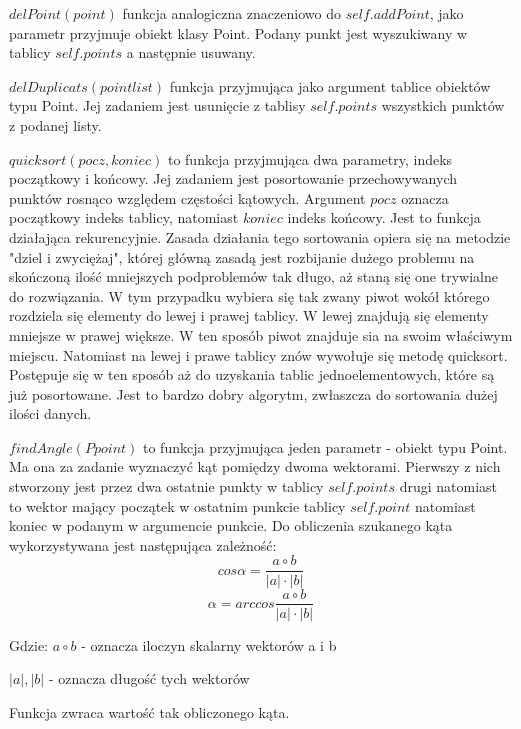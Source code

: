 $delPoint(point)$ funkcja analogiczna znaczeniowo do $self.addPoint$, jako parametr przyjmuje obiekt klasy Point. Podany punkt jest wyszukiwany w tablicy $self.points$ a następnie usuwany.

$delDuplicats(pointlist)$ funkcja przyjmująca jako argument tablice obiektów typu Point. Jej zadaniem jest usunięcie z tablisy $self.points$ wszystkich punktów z podanej listy.

$quicksort(pocz,koniec)$ to funkcja przyjmująca dwa parametry, indeks początkowy i końcowy. Jej zadaniem jest posortowanie przechowywanych punktów rosnąco względem częstości kątowych. Argument $pocz$ oznacza początkowy indeks tablicy, natomiast $koniec$ indeks końcowy. Jest to funkcja działająca rekurencyjnie. Zasada działania tego sortowania opiera się na metodzie "dziel i zwyciężaj", której główną zasadą jest rozbijanie dużego problemu na skończoną ilość mniejszych podproblemów tak długo, aż staną się one trywialne do rozwiązania. W tym przypadku wybiera się tak zwany piwot wokół którego rozdziela się elementy do lewej i prawej tablicy. W lewej znajdują się elementy mniejsze w prawej większe. W ten sposób piwot znajduje sia na swoim właściwym miejscu. Natomiast na lewej i prawe tablicy znów wywołuje się metodę quicksort. Postępuje się w ten sposób aż do uzyskania tablic jednoelementowych, które są już posortowane. Jest to bardzo dobry algorytm, zwłaszcza do sortowania dużej ilości danych.

$findAngle(Ppoint)$ to funkcja przyjmująca jeden parametr - obiekt typu Point. Ma ona za zadanie wyznaczyć kąt pomiędzy dwoma wektorami. Pierwszy z nich stworzony jest przez dwa ostatnie punkty w tablicy $self.points$ drugi natomiast to wektor mający początek w ostatnim punkcie tablicy $self.point$ natomiast koniec w podanym w argumencie punkcie. Do obliczenia szukanego kąta wykorzystywana jest następująca zależność:
\begin{equation}
cos \alpha = \frac{a \circ b}{|a|\cdot |b|}
\end{equation}
\begin{equation}
\alpha = arccos \frac{a \circ b}{|a|\cdot |b|}
\end{equation}

Gdzie:
$a \circ b$ - oznacza iloczyn skalarny wektorów a i b

$|a|,|b|$ - oznacza długość tych wektorów

Funkcja zwraca wartość tak obliczonego kąta.

